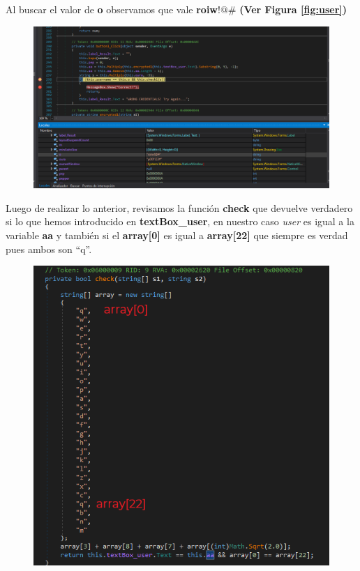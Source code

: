 \documentclass[letterpaper,10pt]{article}
\begin{document}
Al buscar el valor de \textbf{o} observamos que vale \textbf{roiw}!$@$\# \textbf{(Ver Figura \ref{fig:user})}

\begin{figure}[h]
  \centering
  \includegraphics[scale=0.6]{images/tearordear/archivoo}
  \label{fig:archivoo}
\end{figure} 

\newpage

Luego de realizar lo anterior, revisamos la función \textbf{check} que devuelve verdadero si lo que hemos introducido en \textbf{textBox\_user}, en nuestro caso \textit{user} es igual a la variable \textbf{aa} y también si el \textbf{array[0]} es igual a \textbf{array[22]} que siempre es verdad pues ambos son ``q''.

\begin{figure}[h]
  \centering
  \includegraphics[scale=0.8]{images/tearordear/check}
  \label{fig:check}
\end{figure} 
\end{document}
